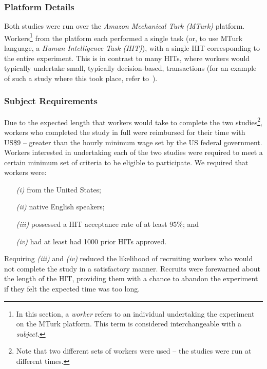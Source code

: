 \subsubsection{Platform Details}
Both studies were run over the \emph{Amazon Mechanical Turk (MTurk)} platform. Workers\footnote{In this section, a \emph{worker} refers to an individual undertaking the experiment on the MTurk platform. This term is considered interchangeable with a \emph{subject.}} from the platform each performed a single task (or, to use MTurk language, a \emph{Human Intelligence Task (HIT)}), with a single HIT corresponding to the entire experiment. This is in contrast to many HITs, where workers would typically undertake small, typically decision-based, transactions (for an example of such a study where this took place, refer to~\cite{bota2016information_cards}).

\subsubsection{Subject Requirements}
Due to the expected length that workers would take to complete the two studies\footnote{Note that two different sets of workers were used -- the studies were run at different times.}, workers who completed the study in full were reimbursed for their time with US\$9 -- greater than the hourly minimum wage set by the US federal government. Workers interested in undertaking each of the two studies were required to meet a certain minimum set of criteria to be eligible to participate. We required that workers were:

\begin{itemize}
    \item[\emph{(i)}]{from the United States;}
    \item[\emph{(ii)}]{native English speakers;}
    \item[\emph{(iii)}]{possessed a HIT acceptance rate of at least 95\%; and}
    \item[\emph{(iv)}]{had at least had 1000 prior HITs approved.}
\end{itemize}

Requiring \emph{(iii)} and \emph{(iv)} reduced the likelihood of recruiting workers who would not complete the study in a satisfactory manner. Recruits were forewarned about the length of the HIT, providing them with a chance to abandon the experiment if they felt the expected time was too long.

